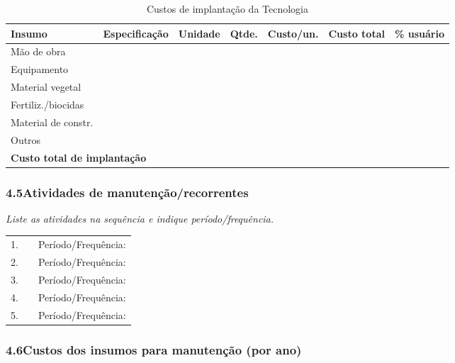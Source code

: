 \begin{table}[htbp]
\centering\small
\caption{Custos de implantação da Tecnologia}
\label{tab:app_cost_estab}
\begin{tabular}{p{2.8cm}p{2.5cm}lrrrl}
\toprule
\textbf{Insumo} & \textbf{Especificação} & \textbf{Unidade} & \textbf{Qtde.} & \textbf{Custo/un.} & \textbf{Custo total} & \textbf{\% usuário} \\
\midrule
Mão de obra      & & & & & & \\
Equipamento      & & & & & & \\
Material vegetal & & & & & & \\
Fertiliz./biocidas & & & & & & \\
Material de constr. & & & & & & \\
Outros           & & & & & & \\
\midrule
\multicolumn{5}{l}{\textbf{Custo total de implantação}} & & \\
\bottomrule
\end{tabular}
\end{table}

\subsubsection*{4.5\quad Atividades de manutenção/recorrentes}
\textit{Liste as atividades na sequência e indique período/frequência.}\\[4pt]
\begin{tabular}{clp{5cm}}
1. & \dotfill & Período/Frequência: \dotfill \\
2. & \dotfill & Período/Frequência: \dotfill \\
3. & \dotfill & Período/Frequência: \dotfill \\
4. & \dotfill & Período/Frequência: \dotfill \\
5. & \dotfill & Período/Frequência: \dotfill \\
\end{tabular}

\subsubsection*{4.6\quad Custos dos insumos para manutenção (por ano)}

